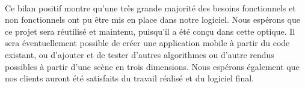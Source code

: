 \paragraph{}
Ce bilan positif montre qu'une très grande majorité des besoins fonctionnels et non fonctionnels ont pu être mis en place dans notre logiciel. Nous espérons que ce projet sera réutilisé et maintenu, puisqu'il a été conçu dans cette optique. Il sera éventuellement possible de créer une application mobile à partir du code existant, ou d'ajouter et de tester d'autres algorithmes ou d'autre rendus possibles à partir d'une scène en trois dimensions. Nous espérons également que nos clients auront été satisfaits du travail réalisé et du logiciel final. 

